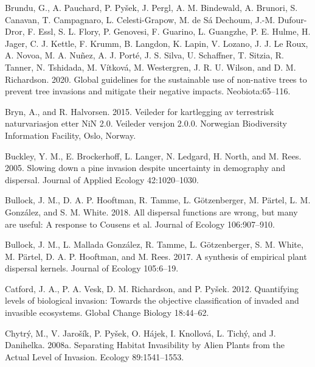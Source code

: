 \documentclass[
]{article}
\begin{document}
\leavevmode\hypertarget{ref-brunduGlobalGuidelinesSustainable2020}{}%
Brundu, G., A. Pauchard, P. Pyšek, J. Pergl, A. M. Bindewald, A. Brunori, S. Canavan, T. Campagnaro, L. Celesti-Grapow, M. de Sá Dechoum, J.-M. Dufour-Dror, F. Essl, S. L. Flory, P. Genovesi, F. Guarino, L. Guangzhe, P. E. Hulme, H. Jager, C. J. Kettle, F. Krumm, B. Langdon, K. Lapin, V. Lozano, J. J. Le Roux, A. Novoa, M. A. Nuñez, A. J. Porté, J. S. Silva, U. Schaffner, T. Sitzia, R. Tanner, N. Tshidada, M. Vítková, M. Westergren, J. R. U. Wilson, and D. M. Richardson. 2020. Global guidelines for the sustainable use of non-native trees to prevent tree invasions and mitigate their negative impacts. Neobiota:65--116.

\leavevmode\hypertarget{ref-brynVeilederKartleggingAv2015}{}%
Bryn, A., and R. Halvorsen. 2015. Veileder for kartlegging av terrestrisk naturvariasjon etter NiN 2.0. Veileder versjon 2.0.0. Norwegian Biodiversity Information Facility, Oslo, Norway.

\leavevmode\hypertarget{ref-buckleySlowingPineInvasion2005}{}%
Buckley, Y. M., E. Brockerhoff, L. Langer, N. Ledgard, H. North, and M. Rees. 2005. Slowing down a pine invasion despite uncertainty in demography and dispersal. Journal of Applied Ecology 42:1020--1030.

\leavevmode\hypertarget{ref-bullockAllDispersalFunctions2018}{}%
Bullock, J. M., D. A. P. Hooftman, R. Tamme, L. Götzenberger, M. Pärtel, L. M. González, and S. M. White. 2018. All dispersal functions are wrong, but many are useful: A response to Cousens et al. Journal of Ecology 106:907--910.

\leavevmode\hypertarget{ref-bullockSynthesisEmpiricalPlant2017}{}%
Bullock, J. M., L. Mallada González, R. Tamme, L. Götzenberger, S. M. White, M. Pärtel, D. A. P. Hooftman, and M. Rees. 2017. A synthesis of empirical plant dispersal kernels. Journal of Ecology 105:6--19.

\leavevmode\hypertarget{ref-catfordQuantifyingLevelsBiological2012}{}%
Catford, J. A., P. A. Vesk, D. M. Richardson, and P. Pyšek. 2012. Quantifying levels of biological invasion: Towards the objective classification of invaded and invasible ecosystems. Global Change Biology 18:44--62.

\leavevmode\hypertarget{ref-chytrySeparatingHabitatInvasibility2008}{}%
Chytrý, M., V. Jarošík, P. Pyšek, O. Hájek, I. Knollová, L. Tichý, and J. Danihelka. 2008a. Separating Habitat Invasibility by Alien Plants from the Actual Level of Invasion. Ecology 89:1541--1553.
\end{document}
